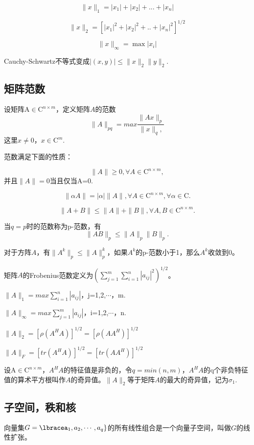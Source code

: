 \documentclass{article}
\begin{document}
$$\parallel x \parallel_1=|x_1|+|x_2|+...+|x_n|$$

$$\parallel x \parallel_2=[|x_1|^2+|x_2|^2+..+|x_n|^2]^{1/2}$$

$$\parallel x \parallel_\infty=\max |x_i|$$

Cauchy-Schwartz不等式变成$|(x,y)|\leqslant \parallel x \parallel_2\parallel y\parallel_2$.

\subsection{矩阵范数}

设矩阵A$\in\mathrm{C}^{n\times m}$，定义矩阵$A$的范数
$$\parallel A\parallel _{pq}=max\frac{\parallel Ax\parallel _p}{\parallel x\parallel _q,}$$
这里$x\neq 0$，$x\in\mathrm{C}^{m}$.

范数满足下面的性质：

$$\parallel A\parallel\ge 0,\forall A\in\mathrm{C}^{n\times m},$$并且$\parallel A\parallel = 0$当且仅当A=0.

$$\parallel\alpha A\parallel = |\alpha|\parallel A\parallel,\forall A\in\mathrm{C}^{n\times m},\forall\alpha\in\mathrm{C}.$$

$$\parallel A+B\parallel\leqslant\parallel A\parallel+\parallel B\parallel,\forall A,B\in\mathrm{C}^{n\times m}.$$

当$q=p$时的范数称为p-范数，有
$$\parallel AB\parallel _p\leqslant\parallel A\parallel _p\parallel B\parallel_p.$$

对于方阵$A$，有$\parallel A^k\parallel_p\leqslant\parallel A\parallel ^k _p$，如果$A^k$的p-范数小于1，那么$A^k$收敛到0。

矩阵$A$的Frobenius范数定义为$(\sum_{j=1}^m\sum_{i=1}^n |a_{ij}|^2)^{1/2}$。

$\parallel A\parallel_1 = max\sum_{i=1}^n |a_{ij}|$，j=1,2,$\cdots$，m.

$\parallel A\parallel_\infty= max\sum_{j=1}^m |a_{ij}|$，i=1,2,$\cdots$，n.

$\parallel A\parallel_2=[\rho(A^HA)]^{1/2}=[\rho(AA^H)]^{1/2}$

$\parallel A\parallel_F=[tr(A^HA)]^{1/2}=[tr(AA^H)]^{1/2}$

设A$\in\mathrm{C}^{n\times m}$，$A^HA$的特征值是非负的，令$q=min(n,m)$，$A^HA$的q个非负特征值的算术平方根叫作$A$的奇异值。$\parallel A\parallel_2$等于矩阵$A$的最大的奇异值，记为$\sigma_1$.

\subsection{子空间，秩和核}
向量集$G=\lbracea_1,a_2,\cdots,a_q\rbrace$的所有线性组合是一个向量子空间，叫做$G$的线性扩张。
\end{document}
